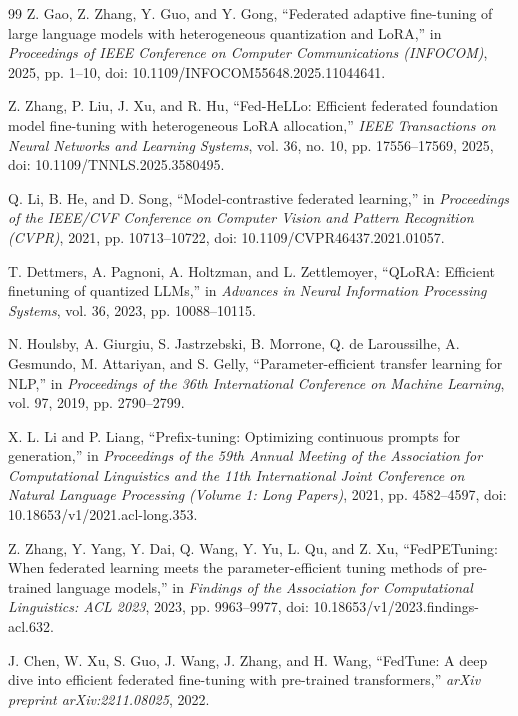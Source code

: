 \documentclass[10pt,conference,letterpaper]{IEEEtran}
\begin{document}
\begin{thebibliography}{99}
Z. Gao, Z. Zhang, Y. Guo, and Y. Gong,
``Federated adaptive fine-tuning of large language models with heterogeneous quantization and LoRA,''
in \emph{Proceedings of IEEE Conference on Computer Communications (INFOCOM)}, 2025, pp. 1--10,
doi: 10.1109/INFOCOM55648.2025.11044641.

Z. Zhang, P. Liu, J. Xu, and R. Hu,
``Fed-HeLLo: Efficient federated foundation model fine-tuning with heterogeneous LoRA allocation,''
\emph{IEEE Transactions on Neural Networks and Learning Systems}, vol. 36, no. 10, pp. 17556--17569, 2025,
doi: 10.1109/TNNLS.2025.3580495.

Q. Li, B. He, and D. Song,
``Model-contrastive federated learning,''
in \emph{Proceedings of the IEEE/CVF Conference on Computer Vision and Pattern Recognition (CVPR)}, 2021, pp. 10713--10722,
doi: 10.1109/CVPR46437.2021.01057.

T. Dettmers, A. Pagnoni, A. Holtzman, and L. Zettlemoyer,
``QLoRA: Efficient finetuning of quantized LLMs,''
in \emph{Advances in Neural Information Processing Systems}, vol. 36, 2023, pp. 10088--10115.

N. Houlsby, A. Giurgiu, S. Jastrzebski, B. Morrone, Q. de Laroussilhe, A. Gesmundo, M. Attariyan, and S. Gelly,
``Parameter-efficient transfer learning for NLP,''
in \emph{Proceedings of the 36th International Conference on Machine Learning}, vol. 97, 2019, pp. 2790--2799.

X. L. Li and P. Liang,
``Prefix-tuning: Optimizing continuous prompts for generation,''
in \emph{Proceedings of the 59th Annual Meeting of the Association for Computational Linguistics and the 11th International Joint Conference on Natural Language Processing (Volume 1: Long Papers)}, 2021, pp. 4582--4597,
doi: 10.18653/v1/2021.acl-long.353.

Z. Zhang, Y. Yang, Y. Dai, Q. Wang, Y. Yu, L. Qu, and Z. Xu,
``FedPETuning: When federated learning meets the parameter-efficient tuning methods of pre-trained language models,''
in \emph{Findings of the Association for Computational Linguistics: ACL 2023}, 2023, pp. 9963--9977,
doi: 10.18653/v1/2023.findings-acl.632.

J. Chen, W. Xu, S. Guo, J. Wang, J. Zhang, and H. Wang,
``FedTune: A deep dive into efficient federated fine-tuning with pre-trained transformers,''
\emph{arXiv preprint arXiv:2211.08025}, 2022.


\end{thebibliography}
\end{document}
